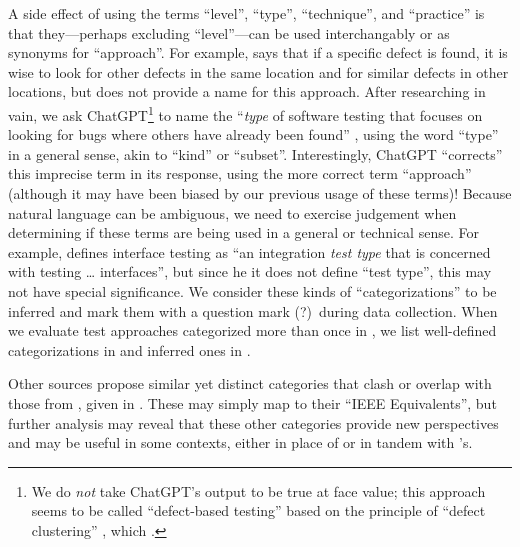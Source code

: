 A side effect of using the terms ``level'', ``type'', ``technique'', and
``practice'' is that they---perhaps excluding ``level''---can
be used interchangably or as synonyms for ``approach''. For example,
\citet[p.~88]{Patton2006} says that if a specific defect is found, it is wise
to look for other defects in the same location and for similar defects in other
locations, but does not provide a name for this approach. After researching in
vain, we ask ChatGPT\footnote{We do \emph{not} take ChatGPT's output to be
    true at face value; this approach seems to be called ``defect-based
    testing'' based on the principle of ``defect clustering''
    \citep{ChatGPT2024}, which \citet{RusEtAl2008} .}
to name the ``\emph{type} of software testing that focuses on looking for bugs
where others have already been found''
\ifnotpaper \citep[emphasis added]{ChatGPT2024}\else \cite{ChatGPT2024}\fi%
,
using the word ``type'' in a general sense, akin to ``kind'' or ``subset''.
Interestingly, ChatGPT ``corrects'' this imprecise term in its response,
using the more correct term ``approach'' (although it may have been biased by
our previous usage of these terms)! Because natural language can be ambiguous,
we need to exercise judgement when determining if these terms are being used
in a general or technical sense. For example,
\citet[p.~45\ifnotpaper, emphasis added\fi]{Kam2008}
defines interface testing as ``an integration \emph{test type} that is
concerned with testing \dots{} interfaces'', but since \ifnotpaper he \else it
\fi does not define ``test type'', this may not have special significance.
\ifnotpaper We consider these kinds of ``categorizations'' to be
    inferred and mark them with a question mark (?)~during data collection.
    When we evaluate test approaches categorized more than once in
    , we list well-defined categorizations in
     and inferred ones in .

    Other sources \citep[such as][]{SWEBOK2024,BarbosaEtAl2006}
    propose similar yet distinct categories that clash or overlap with those
    from \citep{IEEE2022}, given in . These may simply map
    to their ``IEEE Equivalents'', but further analysis may reveal that these
    other categories provide new perspectives and may be useful in some
    contexts, either in place of or in tandem with \citet{IEEE2022}'s.
    \newpage

    \begin{landscape}
        \otherCatsTable{}
    \end{landscape}

